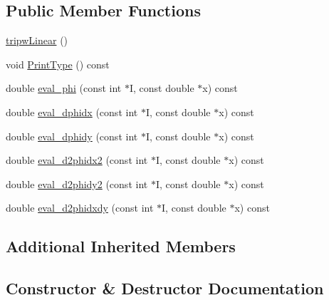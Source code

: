 \subsection*{Public Member Functions}
\begin{DoxyCompactItemize}
\item 
\mbox{\hyperlink{classfemus_1_1tripw_linear_a07f0c4eeb0e78b5b909b23a2d5fee102}{tripw\+Linear}} ()
\item 
void \mbox{\hyperlink{classfemus_1_1tripw_linear_adaef066660723a22e68dd30b91d55357}{Print\+Type}} () const
\item 
double \mbox{\hyperlink{classfemus_1_1tripw_linear_a64d5b18239123c1983bc7342a1525069}{eval\+\_\+phi}} (const int $\ast$I, const double $\ast$x) const
\item 
double \mbox{\hyperlink{classfemus_1_1tripw_linear_afc6135a1c5ae6ef1567610e0d764de3d}{eval\+\_\+dphidx}} (const int $\ast$I, const double $\ast$x) const
\item 
double \mbox{\hyperlink{classfemus_1_1tripw_linear_a9cf54f3f041baa9d16caaa9e4ccf9040}{eval\+\_\+dphidy}} (const int $\ast$I, const double $\ast$x) const
\item 
double \mbox{\hyperlink{classfemus_1_1tripw_linear_aee89b7d0da7add34b1b8fe8b74feb8b1}{eval\+\_\+d2phidx2}} (const int $\ast$I, const double $\ast$x) const
\item 
double \mbox{\hyperlink{classfemus_1_1tripw_linear_a7e8c27384a8008358e7d85ac0c7b3c5e}{eval\+\_\+d2phidy2}} (const int $\ast$I, const double $\ast$x) const
\item 
double \mbox{\hyperlink{classfemus_1_1tripw_linear_ae9ae33080ac87b5f0f4bcb69859095a4}{eval\+\_\+d2phidxdy}} (const int $\ast$I, const double $\ast$x) const
\end{DoxyCompactItemize}
\subsection*{Additional Inherited Members}


\subsection{Constructor \& Destructor Documentation}
\mbox{\label{classfemus_1_1tripw_linear_a07f0c4eeb0e78b5b909b23a2d5fee102}} 
